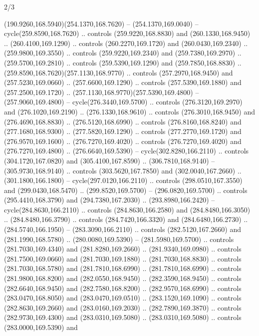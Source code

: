 \begin{flagdescription}{2/3}
\begin{scope}[xshift=0.5\flaglength,yshift=0.5\flagwidth,scale=\flagwidth/259.2]
\begin{scope}[y=0.8pt, x=0.8pt, yscale=-1,shift={(-243,-162)}]
      (190.9260,168.5940)(254.1370,168.7620) -- (254.1370,169.0040) --
      cycle(259.8590,168.7620) .. controls (259.9220,168.8830) and
      (260.1330,168.9450) .. (260.4100,169.1290) .. controls (260.2270,169.1720) and
      (260.0430,169.2340) .. (259.9800,169.3550) .. controls (259.9220,169.2340) and
      (259.7380,169.2970) .. (259.5700,169.2810) .. controls (259.5390,169.1290) and
      (259.7850,168.8830) .. (259.8590,168.7620)(257.1130,168.9770) .. controls
      (257.2970,168.9450) and (257.5230,169.0660) .. (257.6600,169.1290) .. controls
      (257.5390,169.1880) and (257.2500,169.1720) ..
      (257.1130,168.9770)(257.5390,169.4800) -- (257.9060,169.4800) --
      cycle(276.3440,169.5700) .. controls (276.3120,169.2970) and
      (276.1020,169.2190) .. (276.1330,168.9610) .. controls (276.3010,168.9450) and
      (276.4690,168.8830) .. (276.5120,168.6990) .. controls (276.8160,168.8240) and
      (277.1680,168.9300) .. (277.5820,169.1290) .. controls (277.2770,169.1720) and
      (276.9570,169.1600) .. (276.7270,169.4020) .. controls (276.7270,169.4020) and
      (276.7270,169.4800) .. (276.6640,169.5390) -- cycle(302.8280,166.2110) ..
      controls (304.1720,167.0820) and (305.4100,167.8590) .. (306.7810,168.9140) --
      (305.9730,168.9140) .. controls (303.5620,167.7850) and (302.0040,167.2660) ..
      (301.1800,166.1800) -- cycle(297.0120,166.2110) .. controls
      (298.0510,167.3550) and (299.0430,168.5470) .. (299.8520,169.5700) --
      (296.0820,169.5700) .. controls (295.4410,168.3790) and (294.7380,167.2030) ..
      (293.8980,166.2420) -- cycle(284.8630,166.2110) .. controls
      (284.8630,166.2580) and (284.8480,166.3050) .. (284.8480,166.3790) .. controls
      (284.7420,166.3320) and (284.6480,166.2730) .. (284.5740,166.1950) --
      (283.3090,166.2110) .. controls (282.5120,167.2660) and (281.1990,168.5780) ..
      (280.0080,169.5390) -- (281.5980,169.5700) .. controls (281.7030,169.4340) and
      (281.8280,169.2660) .. (281.9340,169.0980) .. controls (281.7500,169.0660) and
      (281.7030,169.1880) .. (281.7030,168.8830) .. controls (281.7030,168.5780) and
      (281.7810,168.6990) .. (281.7810,168.6990) .. controls (281.9800,168.8200) and
      (282.0550,168.9450) .. (282.3590,168.9450) .. controls (282.6640,168.9450) and
      (282.7580,168.8200) .. (282.9570,168.6990) .. controls (283.0470,168.8050) and
      (283.0470,169.0510) .. (283.1520,169.1090) .. controls (282.8630,169.2660) and
      (283.0160,169.2030) .. (282.7890,169.3870) .. controls (282.9730,169.4300) and
      (283.0310,169.5080) .. (283.0310,169.5080) .. controls (283.0000,169.5390) and

\end{scope}
\end{scope}
\end{flagdescription}
